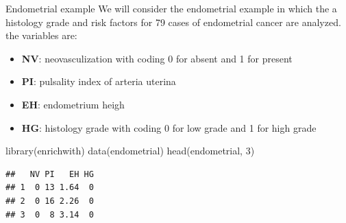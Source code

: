 \documentclass[
  ignorenonframetext,
]{beamer}
\newenvironment{Shaded}{\begin{snugshade}}{\end{snugshade}}
\newcommand{\DecValTok}[1]{\textcolor[rgb]{0.00,0.00,0.81}{#1}}
\newcommand{\FunctionTok}[1]{\textcolor[rgb]{0.00,0.00,0.00}{#1}}
\newcommand{\NormalTok}[1]{#1}
\providecommand{\tightlist}{%
  \setlength{\itemsep}{0pt}\setlength{\parskip}{0pt}}
\begin{document}
\begin{frame}[fragile]{Endometrial example}
\protect\hypertarget{endometrial-example}{}
We will consider the endometrial example in which the a histology grade
and risk factors for 79 cases of endometrial cancer are analyzed. the
variables are:

\begin{itemize}
\tightlist
\item
  \textbf{NV}: neovasculization with coding 0 for absent and 1 for
  present
\item
  \textbf{PI}: pulsality index of arteria uterina
\item
  \textbf{EH}: endometrium heigh
\item
  \textbf{HG}: histology grade with coding 0 for low grade and 1 for
  high grade
\end{itemize}

\vspace{12pt}
\tiny

\begin{Shaded}
\begin{Highlighting}[]
\FunctionTok{library}\NormalTok{(enrichwith)}
\FunctionTok{data}\NormalTok{(endometrial)}
\FunctionTok{head}\NormalTok{(endometrial, }\DecValTok{3}\NormalTok{)}
\end{Highlighting}
\end{Shaded}

\begin{verbatim}
##   NV PI   EH HG
## 1  0 13 1.64  0
## 2  0 16 2.26  0
## 3  0  8 3.14  0
\end{verbatim}
\end{frame}
\end{document}
